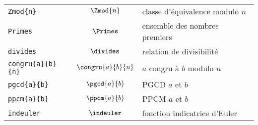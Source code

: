 \documentclass[print]{atomathematyk}
\begin{document}
\begin{longtable}{lcl}
  \texttt{Zmod\{n\}} &  \(\Zmod{n}\) & classe d’équivalence modulo \(n\) \\
  \texttt{Primes} & \(\Primes\) & ensemble des nombres premiers \\
  \texttt{divides} & \(\divides\) & relation de divisibilité \\
  \texttt{congru\{a\}\{b\}\{n\}} & \(\congru{a}{b}{n}\) & \(a\) congru à \(b\) modulo \(n\)\\
  \texttt{pgcd\{a\}\{b\}} & \(\pgcd{a}{b}\) & PGCD \(a\) et \(b\)\\
  \texttt{ppcm\{a\}\{b\}} & \(\ppcm{a}{b}\) & PPCM \(a\) et \(b\)\\
  \texttt{indeuler} & \(\indeuler\) & fonction indicatrice d’Euler\\
  \bottomrule
\end{longtable}
\end{document}
